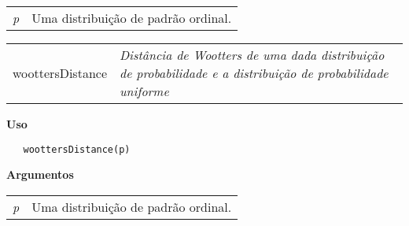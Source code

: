 \documentclass[12pt,letterpaper]{article}
\begin{document}
\begin{table}[!h]
\begin{center}
\begin{tabularx}{\textwidth}{X X}
\hspace{0.5cm} \textit{p} & Uma distribuição de padrão ordinal.\\
\end{tabularx}
\end{center}
\end{table} 

\newpage

\hrulefill   

\begin{table}[!h]
\begin{center}
\begin{tabularx}{\textwidth}{ X X}
\hspace{0.5cm} woottersDistance & \textit{Distância de Wootters de uma dada distribuição de probabilidade e a distribuição de probabilidade uniforme}\\
\end{tabularx}
\end{center}
\end{table} 

\vspace{-0.5cm}

\hrulefill  

\vspace{0.5cm}

\textbf{Uso}

\begin{lstlisting}
   woottersDistance(p)
\end{lstlisting}

\vspace{0.5cm}

\textbf{Argumentos}

\begin{table}[!h]
\begin{center}
\begin{tabularx}{\textwidth}{X X}
\hspace{0.5cm} \textit{p} & Uma distribuição de padrão ordinal.\\
\end{tabularx}
\end{center}
\end{table} 
\end{document}
